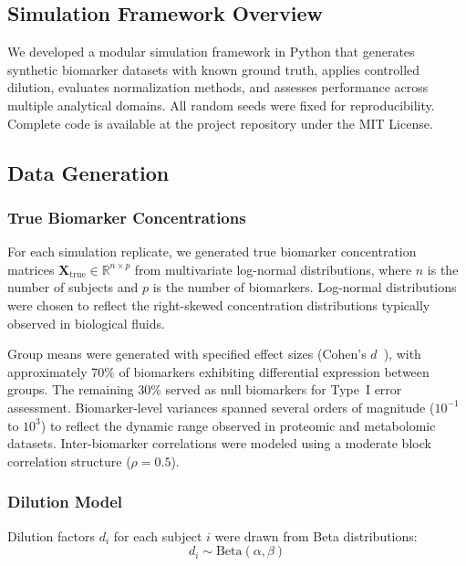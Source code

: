 \documentclass[12pt]{article}
\newcommand{\Xtrue}{\mathbf{X}_{\mathrm{true}}}
\begin{document}
\subsection{Simulation Framework Overview}

We developed a modular simulation framework in Python that generates synthetic biomarker datasets with known ground truth, applies controlled dilution, evaluates normalization methods, and assesses performance across multiple analytical domains. All random seeds were fixed for reproducibility. Complete code is available at the project repository under the MIT License.

\subsection{Data Generation}

\subsubsection{True Biomarker Concentrations}

For each simulation replicate, we generated true biomarker concentration matrices $\Xtrue \in \mathbb{R}^{n \times p}$ from multivariate log-normal distributions, where $n$ is the number of subjects and $p$ is the number of biomarkers. Log-normal distributions were chosen to reflect the right-skewed concentration distributions typically observed in biological fluids.

Group means were generated with specified effect sizes (Cohen's $d$~\cite{Cohen1988}), with approximately 70\% of biomarkers exhibiting differential expression between groups. The remaining 30\% served as null biomarkers for Type~I error assessment. Biomarker-level variances spanned several orders of magnitude ($10^{-1}$ to $10^{3}$) to reflect the dynamic range observed in proteomic and metabolomic datasets. Inter-biomarker correlations were modeled using a moderate block correlation structure ($\rho = 0.5$).

\subsubsection{Dilution Model}

Dilution factors $d_i$ for each subject $i$ were drawn from Beta distributions:
\begin{equation}
d_i \sim \text{Beta}(\alpha, \beta)
\end{equation}
\end{document}
